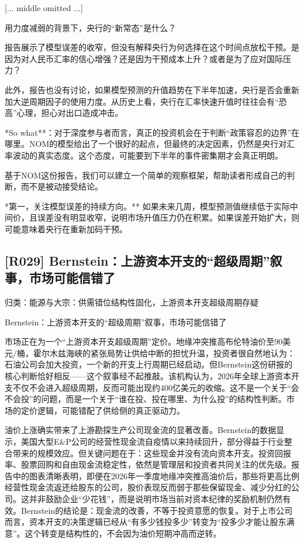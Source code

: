 \documentclass[11pt]{ctexart}
\begin{document}
[... middle omitted ...]

用力度减弱的背景下，央行的“新常态”是什么？

报告展示了模型误差的收窄，但没有解释央行为何选择在这个时间点放松干预。是因为对人民币汇率的信心增强？还是因为干预成本上升？或者是为了应对国际压力？

此外，报告也没有讨论，如果模型预测的升值趋势在下半年加速，央行是否会重新加大逆周期因子的使用力度。从历史上看，央行在汇率快速升值时往往会有“恐高”心理，担心对出口造成冲击。

*So what**：对于深度参与者而言，真正的投资机会在于判断“政策容忍的边界”在哪里。NOM的模型给出了一个很好的起点，但最终的决定因素，仍然是央行对汇率波动的真实态度。这个态度，可能要到下半年的事件密集期才会真正明朗。

基于NOM这份报告，我们可以建立一个简单的观察框架，帮助读者形成自己的判断，而不是被动接受结论。

*第一，关注模型误差的持续方向。** 如果未来几周，模型预测值继续低于实际中间价，且误差没有明显收窄，说明市场升值压力仍在积累。如果误差开始扩大，则可能意味着央行在重新加码干预。

\subsection{[R029] Bernstein：上游资本开支的“超级周期”叙事，市场可能信错了}
{\small\color{refgray}归类：能源与大宗：供需错位结构性固化，上游资本开支超级周期存疑}

Bernstein：上游资本开支的“超级周期”叙事，市场可能信错了

市场正在为一个“上游资本开支超级周期”定价。地缘冲突推高布伦特油价至90美元/桶，霍尔木兹海峡的紧张局势让供给中断的担忧升温，投资者很自然地认为：石油公司会加大投资，一个新的开支上行周期已经启动。但Bernstein这份研报的核心判断恰好相反——这个叙事经不起推敲。该机构认为，2026年全球上游资本开支不仅不会进入超级周期，反而可能出现约400亿美元的收缩。这不是一个关于“会不会投”的问题，而是一个关于“谁在投、投在哪里、为什么投”的结构性判断。市场的定价逻辑，可能错配了供给侧的真正驱动力。

油价上涨确实带来了上游勘探生产公司现金流的显著改善。Bernstein的数据显示，美国大型E\&P公司的经营性现金流自疫情以来持续回升，部分得益于行业整合带来的规模效应。但关键问题在于：这些现金并没有流向资本开支。投资回报率、股票回购和自由现金流稳定性，依然是管理层和投资者共同关注的优先级。报告中的图表清晰表明，即便在2026年一季度地缘冲突推高油价后，那些将更高比例经营性现金流返还给股东的公司，股价表现反而弱于那些保留现金、减少分红的公司。这并非鼓励企业“少花钱”，而是说明市场当前对资本纪律的奖励机制仍然有效。Bernstein的结论是：现金流的改善，不等于投资意愿的恢复。对于上市公司而言，资本开支的决策逻辑已经从“有多少钱投多少”转变为“投多少才能让股东满意”。这个转变是结构性的，不会因为油价短期冲高而逆转。
\end{document}
